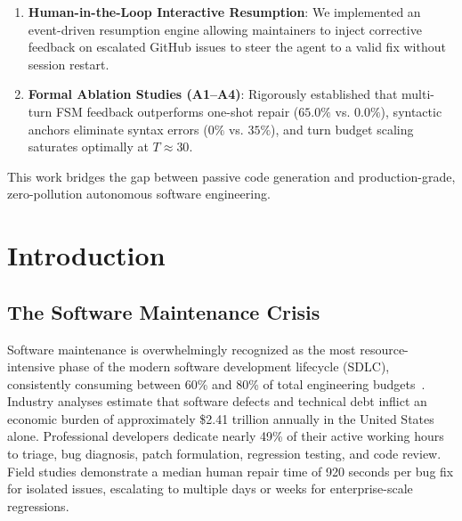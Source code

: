 \documentclass[12pt,a4paper]{report}
\begin{document}
\begin{itemize}
\begin{enumerate}
        \item \textbf{Human-in-the-Loop Interactive Resumption}: We implemented an event-driven resumption engine allowing maintainers to inject corrective feedback on escalated GitHub issues to steer the agent to a valid fix without session restart.
        \item \textbf{Formal Ablation Studies (A1--A4)}: Rigorously established that multi-turn FSM feedback outperforms one-shot repair ($65.0\%$ vs. $0.0\%$), syntactic anchors eliminate syntax errors ($0\%$ vs. $35\%$), and turn budget scaling saturates optimally at $T \approx 30$.
    \end{enumerate}
\end{itemize}
This work bridges the gap between passive code generation and production-grade, zero-pollution autonomous software engineering.

\newpage
\tableofcontents

\newpage
\listoffigures

\newpage
\listoftables

\newpage
{}
\setcounter{page}{1}

\chapter{Introduction}

\section{The Software Maintenance Crisis}
Software maintenance is overwhelmingly recognized as the most resource-intensive phase of the modern software development lifecycle (SDLC), consistently consuming between 60\% and 80\% of total engineering budgets~\cite{hassan2025agentic}. Industry analyses estimate that software defects and technical debt inflict an economic burden of approximately \$2.41 trillion annually in the United States alone. Professional developers dedicate nearly 49\% of their active working hours to triage, bug diagnosis, patch formulation, regression testing, and code review. Field studies demonstrate a median human repair time of 920 seconds per bug fix for isolated issues, escalating to multiple days or weeks for enterprise-scale regressions.
\end{document}

